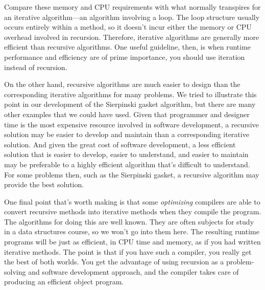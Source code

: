 Compare these memory and CPU requirements with what normally
transpires for an iterative algorithm---an algorithm involving a
loop.  The loop structure usually occurs entirely within a method, so
it doesn't incur either the memory or CPU overhead involved in
recursion.   Therefore, iterative algorithms are generally more
efficient than recursive algorithms.  One useful guideline, then, is
when runtime performance and efficiency are of prime importance, you
should use iteration instead of recursion.


On the other hand, recursive algorithms are much easier to design than
the corresponding iterative algorithms for many problems.  We tried to
illustrate this point in our development of the Sierpinski gasket
algorithm, but there are many other examples that we could have used.
Given that programmer and designer time is the most expensive
resource involved in software development, a recursive solution may be
easier to develop and maintain than a corresponding iterative
solution.  And given the great cost of software development, a less
efficient solution that is easier to develop, easier to understand,
and easier to maintain may be preferable to a highly efficient
algorithm that's difficult to understand.   For some problems then,
such as the Sierpinski gasket, a recursive algorithm may provide the
best solution.


One final point that's worth making is that some {\it optimizing}
compilers are able to convert recursive methods into iterative
methods when they compile the program.   The algorithms for doing this
are well known.  They are often subjects for study in a data structures
course, so we won't go into them here.  The resulting runtime programs
will be just as efficient, in CPU time and memory, as if you had
written iterative methods.  The point is that if you have such a
compiler, you really get the best of both worlds.  You get the
advantage of using recursion as a problem-solving and software
development approach, and the compiler takes care of producing an
efficient object program.


